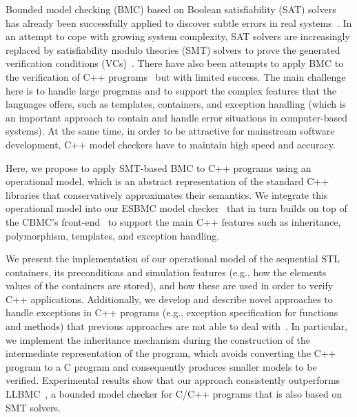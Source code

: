 \documentclass[conference]{IEEEtran}
\begin{document}
Bounded model checking (BMC) based on Boolean satisfiability (SAT) solvers
has already been successfully applied to discover
subtle errors in real systems~\cite{handbook09}. In an attempt to cope
with growing system complexity, SAT solvers are increasingly
replaced by satisfiability modulo theories (SMT) solvers to prove the generated
verification conditions (VCs)~\cite{Armando09,Cordeiro12,Ganai06}.
There have also been attempts to apply BMC to the verification of C++
programs~\cite{Florian12,Yang12} but with limited success. The main challenge
here is to handle large programs and to support the complex features that the
languages offers, such as templates, containers, and exception handling 
(which is an important approach to contain and handle error situations 
in computer-based systems). At the same time, in order to be attractive for 
mainstream software development, C++ model checkers have to maintain high speed and accuracy.

Here, we propose to apply SMT-based BMC to C++ programs using an operational model, which
is an abstract representation of the standard C++ libraries that
conservatively approximates their semantics. We integrate this operational model
into our ESBMC model checker~\cite{Cordeiro12} that in turn builds on top
of the CBMC's front-end~\cite{Clarke04} to support the main C++ features such
as inheritance, polymorphism, templates, and exception handling.

We present the implementation of our operational model of the sequential STL
containers, its preconditions and simulation features (e.g., how the
elements values of the containers are stored), and how these are used in order to verify
C++ applications.  Additionally, we develop and describe novel approaches to handle
exceptions in C++ programs (e.g., exception specification for
functions and methods) that previous approaches are not able to deal
with~\cite{Blanc07,Florian12,PrabhuMBIG11}. In particular, we implement the
inheritance mechanism during the construction of the intermediate
representation of the program, which avoids converting the C++ program
to a C program and consequently produces smaller models to be verified.
Experimental results show that our approach consistently outperforms
LLBMC~\cite{Florian12}, a bounded model checker for C/C++ programs that is 
also based on SMT solvers.
\end{document}
